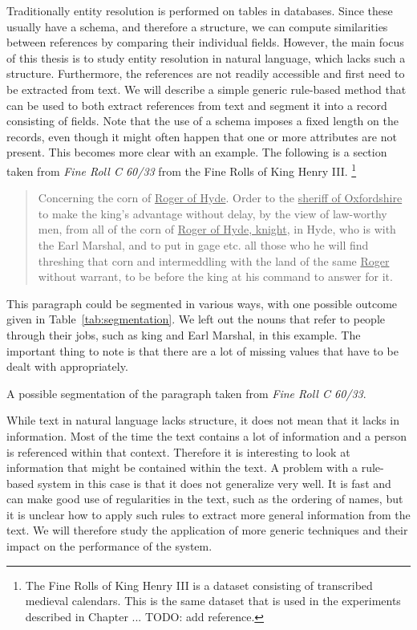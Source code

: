 \documentclass[paper=a4, fontsize=11pt]{scrartcl}
\begin{document}
Traditionally entity resolution is performed on tables in databases.
Since these usually have a schema, and therefore a structure, we can compute similarities between references by comparing their individual fields.
However, the main focus of this thesis is to study entity resolution in natural language, which lacks such a structure.
Furthermore, the references are not readily accessible and first need to be extracted from text.
We will describe a simple generic rule-based method that can be used to both extract references from text and segment it into a record consisting of fields.
Note that the use of a schema imposes a fixed length on the records, even though it might often happen that one or more attributes are not present.
This becomes more clear with an example.
The following is a section taken from \emph{Fine Roll C 60/33} from the Fine Rolls of King Henry III. \footnote{The Fine Rolls of King Henry III is a dataset consisting of transcribed medieval calendars. This is the same dataset that is used in the experiments described in Chapter ... TODO: add reference.}

\begin{quote}
	Concerning the corn of \ul{Roger of Hyde}. Order to the \ul{sheriff of Oxfordshire} to make the king’s advantage without delay, by the view of law-worthy men, from all of the corn of \ul{Roger of Hyde, knight}, in Hyde, who is with the Earl Marshal, and to put in gage etc. all those who he will find threshing that corn and intermeddling with the land of the same \ul{Roger} without warrant, to be before the king at his command to answer for it.
\end{quote}

\noindent This paragraph could be segmented in various ways, with one possible outcome given in Table~\ref{tab:segmentation}.
We left out the nouns that refer to people through their jobs, such as king and Earl Marshal, in this example.
The important thing to note is that there are a lot of missing values that have to be dealt with appropriately.

\begin{table}
	\centering
	
	\caption{A possible segmentation of the paragraph taken from \emph{Fine Roll C 60/33}.}
	\label{tab:segmentation}
\end{table}

While text in natural language lacks structure, it does not mean that it lacks in information.
Most of the time the text contains a lot of information and a person is referenced within that context.
Therefore it is interesting to look at information that might be contained within the text.
A problem with a rule-based system in this case is that it does not generalize very well.
It is fast and can make good use of regularities in the text, such as the ordering of names, but it is unclear how to apply such rules to extract more general information from the text.
We will therefore study the application of more generic techniques and their impact on the performance of the system.
\end{document}
